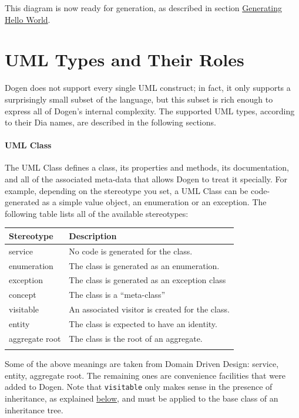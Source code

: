 \documentclass{book}
\begin{document}
This diagram is now ready for generation, as described in section
\href{https://github.com/DomainDrivenConsulting/dogen/blob/master/doc/manual/manual.org#generating-hello-world}{Generating
  Hello World}.

\section{UML Types and Their Roles}

Dogen does not support every single UML construct; in fact, it only
supports a surprisingly small subset of the language, but this subset
is rich enough to express all of Dogen's internal complexity. The
supported UML types, according to their Dia names, are described in
the following sections.

\paragraph{UML Class}

The UML Class defines a class, its properties and methods, its
documentation, and all of the associated meta-data that allows Dogen
to treat it specially. For example, depending on the stereotype you
set, a UML Class can be code-generated as a simple value object, an
enumeration or an exception. The following table lists all of the
available stereotypes:

\begin{center}
\begin{tabular}{ll}
Stereotype & Description\\
\hline
service & No code is generated for the class.\\
enumeration & The class is generated as an enumeration.\\
exception & The class is generated as an exception class\\
concept & The class is a ``meta-class''\\
visitable & An associated visitor is created for the class.\\
entity & The class is expected to have an identity.\\
aggregate root & The class is the root of an aggregate.\\
 & \\
\end{tabular}
\end{center}

Some of the above meanings are taken from Domain Driven Design:
service, entity, aggregate root. The remaining ones are convenience
facilities that were added to Dogen. Note that \texttt{visitable} only
makes sense in the presence of inheritance, as explained
\href{https://github.com/DomainDrivenConsulting/dogen/blob/master/doc/manual/manual.org#uml-generalization}{below},
and must be applied to the base class of an inheritance tree.
\end{document}
